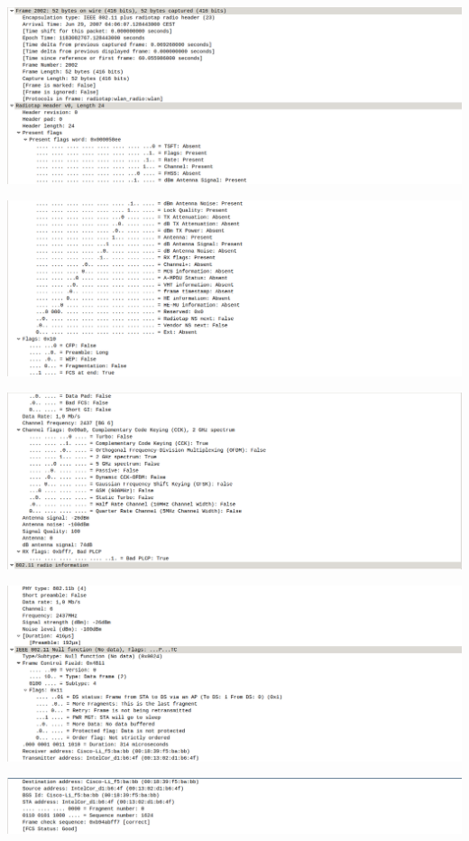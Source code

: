 \documentclass{article}
\begin{document}
\begin{center}
\includegraphics[scale=0.3]{WLAN/nf1.png}
\end{center}
\begin{center}
\includegraphics[scale=0.3]{WLAN/nf2.png}
\end{center}
\begin{center}
\includegraphics[scale=0.3]{WLAN/nf3.png}
\end{center}
\begin{center}
\includegraphics[scale=0.3]{WLAN/nf4.png}
\end{center}
\begin{center}
\includegraphics[scale=0.3]{WLAN/nf5.png}
\end{center}
\end{document}
